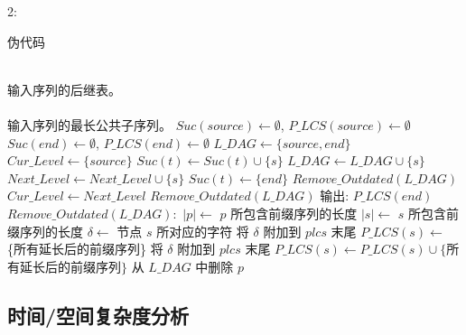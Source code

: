 \begin{varalgorithm}{2:}
  \caption{伪代码}
  \footnotesize
  \label{alg:PMA}
  \begin{algorithmic}[1]
    \REQUIRE ~~\\
    输入序列的后继表。\\
    \ENSURE ~~\\
    输入序列的最长公共子序列。
    \STATE
    \STATE $Suc(source) \leftarrow \emptyset$, $P\_LCS(source) \leftarrow \emptyset$
    \STATE $Suc(end) \leftarrow \emptyset$, $P\_LCS(end) \leftarrow \emptyset$
    \STATE $L\_DAG \leftarrow \{source, end\}$
    \STATE $Cur\_Level \leftarrow \{source\}$
    \STATE
    \STATE $Suc(t) \leftarrow Suc(t) \cup \{s\}$
    \STATE $L\_DAG \leftarrow L\_DAG \cup \{s\}$
    \STATE $Next\_Level \leftarrow Next\_Level \cup \{s\}$
    \ENDIF
    \ENDFOR
    \STATE $Suc(t) \leftarrow \{end\}$
    \ENDIF
    \ENDFOR
    \STATE $Remove\_Outdated(L\_DAG)$
    \STATE $Cur\_Level \leftarrow Next\_Level$
    \ENDWHILE
    \STATE
    \STATE $Remove\_Outdated(L\_DAG)$
    \ENDWHILE
    \STATE
    \STATE 输出: $P\_LCS(end)$
    \STATE
    \STATE $Remove\_Outdated(L\_DAG):$
    \STATE $|p| \leftarrow $ $p$ 所包含前缀序列的长度
    \STATE $|s| \leftarrow $ $s$ 所包含前缀序列的长度
    \STATE $\delta \leftarrow $ 节点 $s$ 所对应的字符
    \STATE 将 $\delta$ 附加到 $plcs$ 末尾
    \ENDFOR
    \STATE $P\_LCS(s) \leftarrow $ \{所有延长后的前缀序列\} 
    \STATE 将 $\delta$ 附加到 $plcs$ 末尾
    \ENDFOR
    \STATE $P\_LCS(s) \leftarrow P\_LCS(s) \cup \{$所有延长后的前缀序列$\}$
    \ENDIF
    \STATE 从 $L\_DAG$ 中删除 $p$
    \ENDFOR
    \ENDFOR
  \end{algorithmic}
\end{varalgorithm}

\subsection{时间/空间复杂度分析}
\label{sec:complexity}


